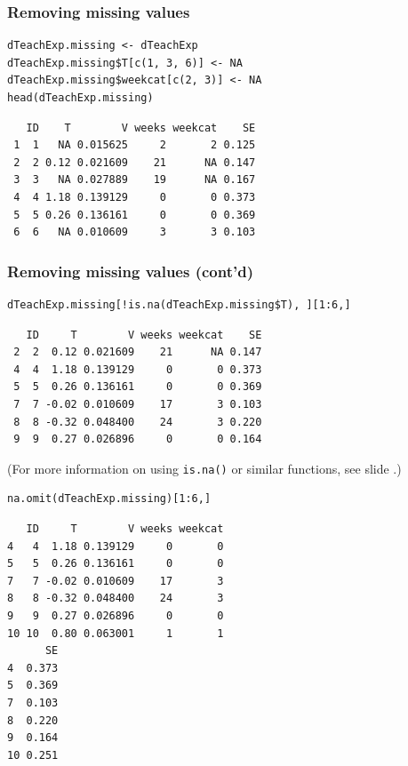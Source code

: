 \documentclass[bigger]{beamer}
\begin{document}
\begin{frame}[fragile,shrink = 20]
\frametitle{Removing missing values}
\label{sec-4-1-6}


\lstset{language=R}
\begin{lstlisting}
dTeachExp.missing <- dTeachExp
dTeachExp.missing$T[c(1, 3, 6)] <- NA
dTeachExp.missing$weekcat[c(2, 3)] <- NA
head(dTeachExp.missing)
\end{lstlisting}

\begin{verbatim}
   ID    T        V weeks weekcat    SE
 1  1   NA 0.015625     2       2 0.125
 2  2 0.12 0.021609    21      NA 0.147
 3  3   NA 0.027889    19      NA 0.167
 4  4 1.18 0.139129     0       0 0.373
 5  5 0.26 0.136161     0       0 0.369
 6  6   NA 0.010609     3       3 0.103
\end{verbatim}
\end{frame}
\begin{frame}[fragile,shrink = 20]
\frametitle{Removing missing values (cont'd)}
\label{sec-4-1-7}


\lstset{language=R}
\begin{lstlisting}
dTeachExp.missing[!is.na(dTeachExp.missing$T), ][1:6,]
\end{lstlisting}

\begin{verbatim}
   ID     T        V weeks weekcat    SE
 2  2  0.12 0.021609    21      NA 0.147
 4  4  1.18 0.139129     0       0 0.373
 5  5  0.26 0.136161     0       0 0.369
 7  7 -0.02 0.010609    17       3 0.103
 8  8 -0.32 0.048400    24       3 0.220
 9  9  0.27 0.026896     0       0 0.164
\end{verbatim}

(For more information on using \texttt{is.na()} or similar functions, see slide \pageref{slide_is_function}.)



\lstset{language=R}
\begin{lstlisting}
na.omit(dTeachExp.missing)[1:6,]
\end{lstlisting}


\begin{verbatim}
   ID     T        V weeks weekcat
4   4  1.18 0.139129     0       0
5   5  0.26 0.136161     0       0
7   7 -0.02 0.010609    17       3
8   8 -0.32 0.048400    24       3
9   9  0.27 0.026896     0       0
10 10  0.80 0.063001     1       1
      SE
4  0.373
5  0.369
7  0.103
8  0.220
9  0.164
10 0.251
\end{verbatim}
\end{frame}
\end{document}
